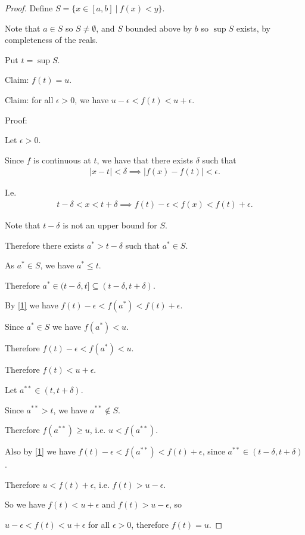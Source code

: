 \documentclass[12pt]{article}
\begin{document}
\begin{proof}

  Define $S = \{x \in [a, b] ~|~ f(x) < y\}$.

  Note that $a \in S$ so $S \neq \emptyset$, and $S$ bounded above by $b$ so $\sup S$ exists, by
  completeness of the reals.

  Put $t = \sup S$.

  Claim: $f(t) = u$.




  Claim: for all $\epsilon > 0$, we have $u - \epsilon < f(t) < u + \epsilon$.

  Proof:

  Let $\epsilon > 0$.

  Since $f$ is continuous at $t$, we have that there exists $\delta$ such that
  \begin{align} \label{1}
    |x - t| < \delta \implies |f(x) - f(t)| < \epsilon.
  \end{align}

  I.e.
  \begin{align*}
    t - \delta < x < t + \delta \implies f(t) - \epsilon < f(x) < f(t) + \epsilon.
  \end{align*}

  Note that $t - \delta$ is not an upper bound for $S$.

  Therefore there exists $a^* > t - \delta$ such that $a^* \in S$.

  As $a^* \in S$, we have $a^* \leq t$.

  Therefore $a^* \in (t - \delta, t] \subseteq (t - \delta, t + \delta)$.

  By \eqref{1} we have $f(t) - \epsilon < f(a^*) < f(t) + \epsilon$.

  Since $a^* \in S$ we have $f(a^*) < u$.

  Therefore $f(t) - \epsilon < f(a^*) < u$.

  Therefore $f(t) < u + \epsilon$.

  Let $a^{**} \in (t, t + \delta)$.

  Since $a^{**} > t$, we have $a^{**} \notin S$.

  Therefore $f(a^{**}) \geq u$, i.e. $u < f(a^{**})$.

  Also by \eqref{1} we have $f(t) - \epsilon < f(a^{**}) < f(t) + \epsilon$, since
  $a^{**} \in (t - \delta, t + \delta)$.

  Therefore $u < f(t) + \epsilon$, i.e. $f(t) > u - \epsilon$.

  So we have $f(t) < u + \epsilon$ and $f(t) > u - \epsilon$, so

  $u - \epsilon < f(t) < u + \epsilon$ for all $\epsilon > 0$, therefore $f(t) = u$.
\end{proof}
\end{document}
